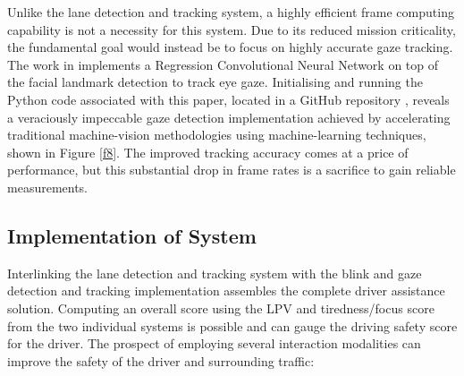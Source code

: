 \documentclass[10pt,conference]{IEEEtran}
\begin{document}
Unlike the lane detection and tracking system, a highly efficient frame computing capability is not a necessity for this system. Due to its reduced mission criticality, the fundamental goal would instead be to focus on highly accurate gaze tracking. The work in \cite{b17} implements a Regression Convolutional Neural Network on top of the facial landmark detection to track eye gaze. Initialising and running the Python code associated with this paper, located in a GitHub repository \cite{b18}, reveals a veraciously impeccable gaze detection implementation achieved by accelerating traditional machine-vision methodologies using machine-learning techniques, shown in Figure \ref{f8}. The improved tracking accuracy comes at a price of performance, but this substantial drop in frame rates is a sacrifice to gain reliable measurements.

\subsection{Implementation of System}

Interlinking the lane detection and tracking system with the blink and gaze detection and tracking implementation assembles the complete driver assistance solution. Computing an overall score using the LPV and tiredness/focus score from the two individual systems is possible and can gauge the driving safety score for the driver. The prospect of employing several interaction modalities can improve the safety of the driver and surrounding traffic:
\end{document}
